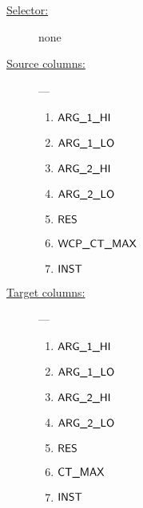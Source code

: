 \begin{description}
	\item[\underline{Selector:}] none
	\item[\underline{Source columns:}] ---
		\begin{multicols}{4}
			\begin{enumerate}
				\item $\textsf{ARG}\textsf{\_1}\textsf{\_HI}$
				\item $\textsf{ARG}\textsf{\_1}\textsf{\_LO}$
				\item $\textsf{ARG}\textsf{\_2}\textsf{\_HI}$
				\item $\textsf{ARG}\textsf{\_2}\textsf{\_LO}$
				\item $\textsf{RES}$
				\item $\textsf{WCP\_CT\_MAX}$
				\item $\textsf{INST}$
			\end{enumerate}
		\end{multicols}
	\item[\underline{Target columns:}] ---
		\begin{multicols}{4}
		\begin{enumerate}
			\item $\textsf{ARG}\textsf{\_1}\textsf{\_HI}$
			\item $\textsf{ARG}\textsf{\_1}\textsf{\_LO}$
			\item $\textsf{ARG}\textsf{\_2}\textsf{\_HI}$
			\item $\textsf{ARG}\textsf{\_2}\textsf{\_LO}$
			\item $\textsf{RES}$
			\item $\textsf{CT\_MAX}$
			\item $\textsf{INST}$
		\end{enumerate}
		\end{multicols}
\end{description}
